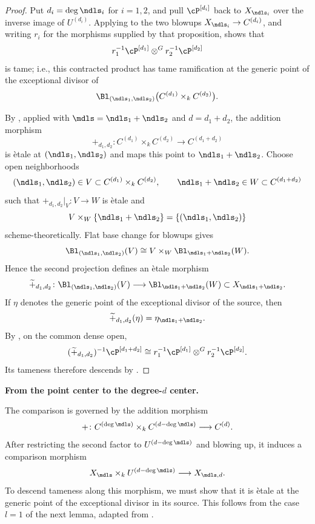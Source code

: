\begin{proof}
Put $d_i=\deg\ndls_i$ for $i=1,2$, and pull $\cP^{[d_i]}$ back to
$X_{\ndls_i}$ over the inverse image of $U^{(d_i)}$. Applying
 to the two blowups
$X_{\ndls_i}\to C^{(d_i)}$, and writing $r_i$ for the morphisms supplied
by that proposition, shows that
\[
r_1^{-1}\cP^{[d_1]}\otimes^G r_2^{-1}\cP^{[d_2]}
\]
is tame; i.e., this contracted product has tame ramification at the generic
point of the exceptional divisor of
\[
\Bl_{(\ndls_1,\ndls_2)}
   \bigl(C^{(d_1)}\times_k C^{(d_2)}\bigr).
\]

By , applied with
$\mdls=\ndls_1+\ndls_2$ and $d=d_1+d_2$, the addition morphism
\[
+_{d_1,d_2}\colon
C^{(d_1)}\times_k C^{(d_2)}
\longrightarrow C^{(d_1+d_2)}
\]
is \`etale at $(\ndls_1,\ndls_2)$ and maps this point to
$\ndls_1+\ndls_2$. Choose open neighborhoods
\[
(\ndls_1,\ndls_2)\in V\subset C^{(d_1)}\times_k C^{(d_2)},
\qquad
\ndls_1+\ndls_2\in W\subset C^{(d_1+d_2)}
\]
such that $+_{d_1,d_2}|_V\colon V\to W$ is \`etale and
\[
V\times_W\{\ndls_1+\ndls_2\}=\{(\ndls_1,\ndls_2)\}
\]
scheme-theoretically. Flat base change for blowups gives
\[
\Bl_{(\ndls_1,\ndls_2)}(V)
\cong
V\times_W\Bl_{\ndls_1+\ndls_2}(W).
\]
Hence the second projection defines an \`etale morphism
\[
\widetilde{+}_{d_1,d_2}\colon
\Bl_{(\ndls_1,\ndls_2)}(V)
\longrightarrow
\Bl_{\ndls_1+\ndls_2}(W)
\subset X_{\ndls_1+\ndls_2}.
\]
If $\eta$ denotes the generic point of the exceptional divisor of the
source, then
\[
\widetilde{+}_{d_1,d_2}(\eta)=\eta_{\ndls_1+\ndls_2}.
\]
By , on the common dense open,
\[
(\widetilde{+}_{d_1,d_2})^{-1}\cP^{[d_1+d_2]}
\cong
r_1^{-1}\cP^{[d_1]}\otimes^G r_2^{-1}\cP^{[d_2]}.
\]
Its tameness therefore descends by
.
\end{proof}

\noindent\textbf{From the point center to the degree-$d$ center.}

The comparison is governed by the addition morphism
\[
+\colon C^{(\deg\mdls)}\times_k C^{(d-\deg\mdls)}\longrightarrow C^{(d)}.
\]
After restricting the second factor to $U^{(d-\deg\mdls)}$ and blowing up,
it induces a comparison morphism
\[
X_{\mdls}\times_k U^{(d-\deg\mdls)}\longrightarrow X_{\mdls,d}.
\]
To descend tameness along this morphism, we must show that it is \`etale at
the generic point of the exceptional divisor in its source. This follows
from the case $l=1$ of the next lemma, adapted from
\cite[Lemma~4.1]{takeuchi2018blow}.

